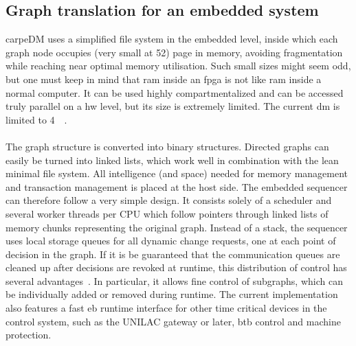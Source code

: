 \subsection{Graph translation for an embedded system}
carpeDM uses a simplified file system in the embedded level, inside which each graph node occupies (very small at \SI{52}{\byte}) page in memory, avoiding fragmentation while reaching near optimal memory utilisation.
Such small sizes might seem odd, but one must keep in mind that \gls{ram} inside an \gls{fpga} is not like \gls{ram} inside a normal computer. It can be used highly compartmentalized and can be accessed truly parallel on a \gls{hw} level, but its size is extremely limited. The current \gls{dm} is limited to \SI{4}{\mega\byte}.
\paragraph{}
The graph structure is converted into binary structures. Directed graphs can easily be turned into linked lists, which work well in combination with the lean minimal file system.
All intelligence (and space) needed for memory management and transaction management is placed at the host side. The embedded sequencer can therefore follow a very simple design. It consists solely of a scheduler and several worker threads per CPU which follow pointers through linked lists of memory chunks representing the original graph.
Instead of a stack, the sequencer uses local storage queues for all dynamic change requests, one at each point of decision in the graph.
If it is be guaranteed that the communication queues are cleaned up after decisions are revoked at runtime, this distribution of control has several advantages~\cite[]{}. In particular, it allows fine control of subgraphs, which can be individually added or removed during runtime.
The current implementation also features a fast \gls{eb} runtime interface for other time critical devices in the control system, such as the UNILAC gateway or later, \gls{btb} control and machine protection.



